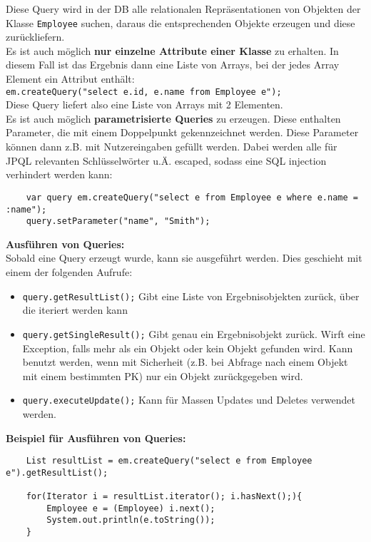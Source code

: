 Diese Query wird in der DB alle relationalen Repräsentationen von Objekten der Klasse \lstinline{Employee} suchen, daraus die entsprechenden Objekte erzeugen und diese zurückliefern.\\
Es ist auch möglich \textbf{nur einzelne Attribute einer Klasse} zu erhalten. In diesem Fall ist das Ergebnis dann eine Liste von Arrays, bei der jedes Array Element ein Attribut enthält:\\

\lstinline{em.createQuery("select e.id, e.name from Employee e");}\\

Diese Query liefert also eine Liste von Arrays mit 2 Elementen.\\
Es ist auch möglich \textbf{parametrisierte Queries} zu erzeugen. Diese enthalten Parameter, die mit einem Doppelpunkt gekennzeichnet werden. Diese Parameter können dann z.B. mit Nutzereingaben gefüllt werden. Dabei werden alle für JPQL relevanten Schlüsselwörter u.Ä. escaped, sodass eine SQL injection verhindert werden kann:\\


\begin{lstlisting}
    var query em.createQuery("select e from Employee e where e.name = :name");
    query.setParameter("name", "Smith");
\end{lstlisting}

\textbf{Ausführen von Queries:}\\

Sobald eine Query erzeugt wurde, kann sie ausgeführt werden. Dies geschieht mit einem der folgenden Aufrufe:
\begin{itemize}
    \item \lstinline{query.getResultList();} Gibt eine Liste von Ergebnisobjekten zurück, über die iteriert werden kann
    \item \lstinline{query.getSingleResult();} Gibt genau ein Ergebnisobjekt zurück. Wirft eine Exception, falls mehr als ein Objekt oder kein Objekt gefunden wird. Kann benutzt werden, wenn mit Sicherheit (z.B. bei Abfrage nach einem Objekt mit einem bestimmten PK) nur ein Objekt zurückgegeben wird.
    \item \lstinline{query.executeUpdate();} Kann für Massen Updates und Deletes verwendet werden.
\end{itemize}

\textbf{Beispiel für Ausführen von Queries:}\\

\begin{lstlisting}
    List resultList = em.createQuery("select e from Employee e").getResultList();
    
    for(Iterator i = resultList.iterator(); i.hasNext();){
        Employee e = (Employee) i.next();
        System.out.println(e.toString());
    }
\end{lstlisting}

